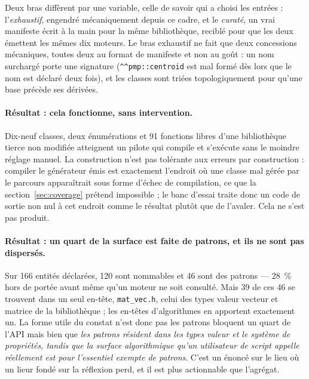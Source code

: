 \documentclass[11pt,a4paper]{article}
\newcommand{\code}[1]{\texttt{\small #1}}
\begin{document}
Deux bras diffèrent par une variable, celle de savoir qui a choisi les entrées :
l'\emph{exhaustif}, engendré mécaniquement depuis ce cadre, et le \emph{curaté},
un vrai manifeste écrit à la main pour la même bibliothèque, reciblé pour que les
deux émettent les mêmes dix moteurs. Le bras exhaustif ne fait que deux
concessions mécaniques, toutes deux au format de manifeste et non au goût : un
nom surchargé porte une signature (\code{\^{}\^{}pmp::centroid} est mal formé dès
lors que le nom est déclaré deux fois), et les classes sont triées
topologiquement pour qu'une base précède ses dérivées.

\paragraph{Résultat : cela fonctionne, sans intervention.} Dix-neuf classes, deux
énumérations et 91 fonctions libres d'une bibliothèque tierce non modifiée
atteignent un pilote qui compile et s'exécute sans le moindre réglage manuel. La
construction n'est pas tolérante aux erreurs par construction : compiler le
générateur émis est exactement l'endroit où une classe mal gérée par le parcours
apparaîtrait sous forme d'échec de compilation, ce que la
section~\ref{sec:coverage} prétend impossible ; le banc d'essai traite donc un
code de sortie non nul à cet endroit comme le résultat plutôt que de l'avaler.
Cela ne s'est pas produit.

\paragraph{Résultat : un quart de la surface est faite de patrons, et ils ne sont
pas dispersés.} Sur 166 entités déclarées, 120 sont nommables et 46 sont des
patrons --- 28~\% hors de portée avant même qu'un moteur ne soit consulté. Mais
39 de ces 46 se trouvent dans un seul en-tête, \code{mat\_vec.h}, celui des types
valeur vecteur et matrice de la bibliothèque ; les en-têtes d'algorithmes en
apportent exactement un. La forme utile du constat n'est donc pas \og les patrons
bloquent un quart de l'API \fg{} mais bien que \emph{les patrons résident dans
les types valeur et le système de propriétés, tandis que la surface algorithmique
qu'un utilisateur de script appelle réellement est pour l'essentiel exempte de
patrons}. C'est un énoncé sur le lieu où un lieur fondé sur la réflexion perd, et
il est plus actionnable que l'agrégat.
\end{document}
